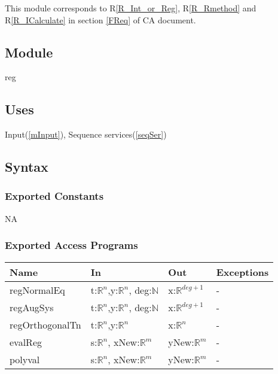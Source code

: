 \documentclass[12pt, titlepage]{article}
\begin{document}
This module corresponds to R\ref{R_Int_or_Reg}, R\ref{R_Rmethod} and 
R\ref{R_ICalculate} in section \ref{FReq} of CA document.

\subsection{Module}

reg

\subsection{Uses}

Input(\ref{mInput}), Sequence services(\ref{seqSer})

\subsection{Syntax}

\subsubsection{Exported Constants}

NA

\subsubsection{Exported Access Programs}

\begin{center}
	\begin{tabular}{p{4cm} p{4cm} p{4cm} p{2cm}}
		\hline
		\textbf{Name} & \textbf{In} & \textbf{Out} & \textbf{Exceptions} \\
		\hline
		
		regNormalEq & t:$\mathbb{R}^n$,y:$\mathbb{R}^n$, deg:$\mathbb{N}$  & 
		x:$\mathbb{R}^{deg+1}$ & - \\
		
		regAugSys & t:$\mathbb{R}^n$,y:$\mathbb{R}^n$, deg:$\mathbb{N}$ & 
		x:$\mathbb{R}^{deg+1}$& - \\
		
		regOrthogonalTn & t:$\mathbb{R}^n$,y:$\mathbb{R}^n$ & x:$\mathbb{R}^{n}$
		& - \\
		evalReg & s:$\mathbb{R}^n$, xNew:$\mathbb{R}^m$ & yNew:$\mathbb{R}^m$ & 
		- \\

		polyval & s:$\mathbb{R}^n$, xNew:$\mathbb{R}^m$ & yNew:$\mathbb{R}^m$ & 
		- \\		
		\hline
	\end{tabular}
\end{center}
\end{document}
